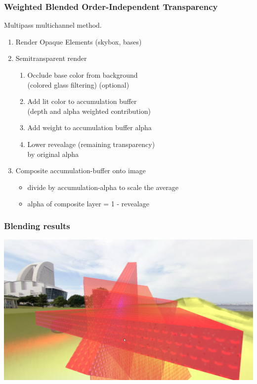 \documentclass[12pt]{beamer}
\begin{document}
    \begin{frame}
        \frametitle{Weighted Blended Order-Independent Transparency}

        Multipass multichannel method.

        \begin{enumerate}
            \item Render Opaque Elements (skybox, bases)
            \item Semitransparent render
            \begin{enumerate}
                \item Occlude base color from background \\ (colored glass filtering) (optional)
                \item Add lit color to accumulation buffer \\ (depth and alpha weighted contribution)
                \item Add weight to accumulation buffer alpha
                \item Lower revealage (remaining transparency) \\by original alpha
            \end{enumerate}
            \item Composite accumulation-buffer onto image
            \begin{itemize}
                \item divide by accumulation-alpha to scale the average
                \item alpha of composite layer = 1 - revealage
            \end{itemize}
        \end{enumerate}
    \end{frame}

    \begin{frame}
        \frametitle{Blending results}
        \includegraphics[width=\textwidth]{blending}
    \end{frame}
\end{document}
